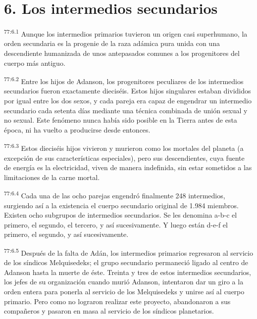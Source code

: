 \section*{6. Los intermedios secundarios}
\par
\textsuperscript{77:6.1} Aunque los intermedios primarios tuvieron un origen casi superhumano, la orden secundaria es la progenie de la raza adámica pura unida con una descendiente humanizada de unos antepasados comunes a los progenitores del cuerpo más antiguo.

\par
\textsuperscript{77:6.2} Entre los hijos de Adanson, los progenitores peculiares de los intermedios secundarios fueron exactamente dieciséis. Estos hijos singulares estaban divididos por igual entre los dos sexos, y cada pareja era capaz de engendrar un intermedio secundario cada setenta días mediante una técnica combinada de unión sexual y no sexual. Este fenómeno nunca había sido posible en la Tierra antes de esta época, ni ha vuelto a producirse desde entonces.

\par
\textsuperscript{77:6.3} Estos dieciséis hijos vivieron y murieron como los mortales del planeta (a excepción de sus características especiales), pero sus descendientes, cuya fuente de energía es la electricidad, viven de manera indefinida, sin estar sometidos a las limitaciones de la carne mortal.

\par
\textsuperscript{77:6.4} Cada una de las ocho parejas engendró finalmente 248 intermedios, surgiendo así a la existencia el cuerpo secundario original de 1.984 miembros. Existen ocho subgrupos de intermedios secundarios. Se les denomina a-b-c el primero, el segundo, el tercero, y así sucesivamente. Y luego están d-e-f el primero, el segundo, y así sucesivamente.

\par
\textsuperscript{77:6.5} Después de la falta de Adán, los intermedios primarios regresaron al servicio de los síndicos Melquisedeks; el grupo secundario permaneció ligado al centro de Adanson hasta la muerte de éste. Treinta y tres de estos intermedios secundarios, los jefes de su organización cuando murió Adanson, intentaron dar un giro a la orden entera para ponerla al servicio de los Melquisedeks y unirse así al cuerpo primario. Pero como no lograron realizar este proyecto, abandonaron a sus compañeros y pasaron en masa al servicio de los síndicos planetarios.

